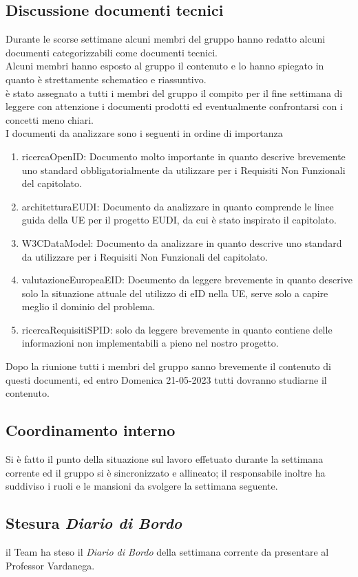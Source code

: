 \subsection{Discussione documenti tecnici}
Durante le scorse settimane alcuni membri del gruppo hanno redatto alcuni documenti categorizzabili come documenti tecnici.\\
Alcuni membri hanno esposto al gruppo il contenuto e lo hanno spiegato in quanto è strettamente schematico e riassuntivo.\\
è stato assegnato a tutti i membri del gruppo il compito per il fine settimana di leggere con attenzione i documenti prodotti ed eventualmente confrontarsi con i concetti meno chiari.\\
I documenti da analizzare sono i seguenti in ordine di importanza
\begin{enumerate}
\item ricercaOpenID: Documento molto importante in quanto descrive brevemente uno standard obbligatorialmente da utilizzare per i Requisiti Non Funzionali del capitolato.
\item architetturaEUDI: Documento da analizzare in quanto comprende le linee guida della UE per il progetto EUDI, da cui è stato inspirato il capitolato.
\item W3CDataModel: Documento da analizzare in quanto descrive uno standard da utilizzare per i Requisiti Non Funzionali del capitolato.
\item valutazioneEuropeaEID: Documento da leggere brevemente in quanto descrive solo la situazione attuale del utilizzo di eID nella UE, serve solo a capire meglio il dominio del problema.
\item ricercaRequisitiSPID: solo da leggere brevemente in quanto contiene delle informazioni non implementabili a pieno nel nostro progetto.
\end{enumerate}
Dopo la riunione tutti i membri del gruppo sanno brevemente il contenuto di questi documenti, ed entro Domenica 21-05-2023 tutti dovranno studiarne il contenuto.

\subsection{Coordinamento interno}
Si è fatto il punto della situazione sul lavoro effetuato durante la settimana corrente ed il gruppo si è sincronizzato e allineato; il responsabile inoltre ha suddiviso i ruoli e le mansioni da svolgere la settimana seguente. 

\subsection{Stesura \textit{Diario di Bordo}}
il Team ha steso il \textit{Diario di Bordo} della settimana corrente da presentare al Professor Vardanega.